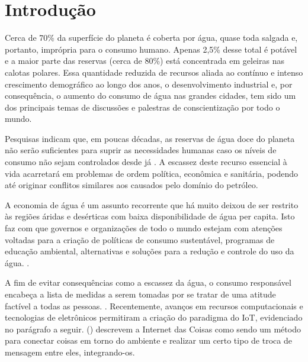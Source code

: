 \chapter[Introdução]{Introdução}

Cerca de 70\% da superfície do planeta é coberta por água, quase toda salgada e, portanto, imprópria para o consumo humano. Apenas 2,5\% desse total é potável e a maior parte das reservas (cerca de 80\%) está concentrada em geleiras nas calotas polares. 
Essa quantidade reduzida de recursos aliada ao contínuo e intenso crescimento demográfico ao longo dos anos, o desenvolvimento industrial e, por consequência, o aumento do consumo de água nas grandes cidades, tem sido um dos principais temas de discussões e palestras de conscientização por todo o mundo. \cite{aguaconsumo}

Pesquisas indicam que, em poucas décadas, as reservas de água doce do planeta não serão suficientes para suprir as necessidades humanas caso os níveis de consumo não sejam controlados desde já \cite{Diarias2007}. A escassez deste recurso essencial à vida acarretará em problemas de ordem política, econômica e sanitária, podendo até originar conflitos similares aos causados pelo domínio do petróleo.

A economia de água é um assunto recorrente que há muito deixou de ser restrito às regiões áridas e desérticas com baixa disponibilidade de água per capita. Isto faz com que governos e organizações de todo o mundo estejam com atenções voltadas para a criação de políticas de consumo sustentável, programas de educação ambiental, alternativas e soluções para a redução e controle do uso da água. \cite{ferreirasistema}.

A fim de evitar consequências como a escassez da água, o consumo
responsável encabeça a lista de medidas a serem tomadas por se tratar de uma atitude factível a todas as pessoas. \cite{Diarias2007}. Recentemente, avanços em recursos computacionais e tecnologias de eletrônicos permitiram a criação do paradigma do IoT, evidenciado no parágrafo a seguir. \citeauthor{Perumal2016} (\citeyear{Perumal2016}) descrevem a Internet das Coisas como sendo um método para conectar coisas em torno do ambiente e realizar um certo tipo de troca de mensagem entre eles, integrando-os.

